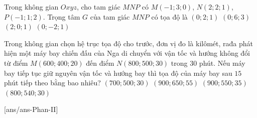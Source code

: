\begin{ex}%
Trong không gian $Oxyz$, cho tam giác $MNP$ có $M(-1;3;0)$, $N(2;2;1)$, $P(-1;1;2)$. Trọng tâm $G$ của tam giác $MNP$ có tọa độ là
\choice
{\True $(0;2;1)$}
{$(0;6;3)$}
{$(2;0;1)$}
{$(0;-2;1)$}
\end{ex}


\begin{ex}%
Trong không gian chọn hệ trục tọa độ cho trước, đơn vị đo là kilômét, rađa phát hiện một máy bay chiến đấu của Nga di chuyển với vận tốc và hướng không đổi từ điểm $M(600;400;20)$ đến điểm $N(800;500;30)$ trong $30$ phút. Nếu máy bay tiếp tục giữ nguyên vận tốc và hướng bay thì tọa độ của máy bay sau $15$ phút tiếp theo bằng bao nhiêu?
\choice
{$(700;500;30)$}
{$(900;650;55)$}
{\True $(900;550;35)$}
{$(800;540;30)$}
\end{ex}


\TNTF
{}[ans/ans\currfilebase-Phan-II]

